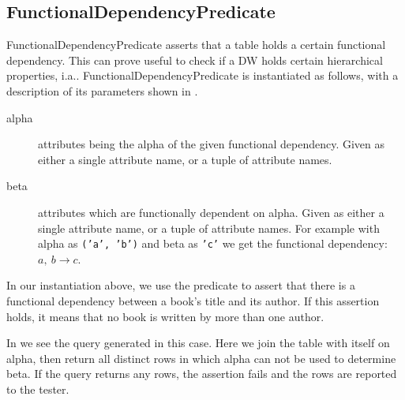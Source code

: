 \subsection{FunctionalDependencyPredicate}
FunctionalDependencyPredicate asserts that a table holds a certain functional dependency. This can prove useful to check if a DW holds certain hierarchical properties, i.a.. FunctionalDependencyPredicate is instantiated as follows, with a description of its parameters shown in .


\begin{description}
\item [alpha] attributes being the alpha of the given functional dependency. Given as either a single attribute name, or a tuple of attribute names.
\item [beta] attributes which are functionally dependent on alpha. Given as either a single attribute name, or a tuple of attribute names.
For example with alpha as \texttt{('a', 'b')} and beta as  \texttt{'c'} we get the functional dependency: $a,\ b \rightarrow c$.
\end{description}

In our instantiation above, we use the predicate to assert that there is a functional dependency between a book's title and its author. If this assertion holds, it means that no book is written by more than one author.

In  we see the query generated in this case. Here we join the table with itself on alpha, then return all distinct rows in which alpha can not be used to determine beta. If the query returns any rows, the assertion fails and the rows are reported to the tester.    

